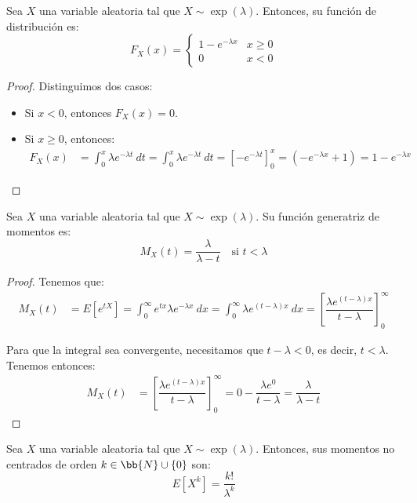 \begin{prop}
    Sea $X$ una variable aleatoria tal que $X\sim \exp(\lambda)$. Entonces, su función de distribución es:
    \begin{equation*}
        F_X(x) = \begin{cases}
            1-e^{-\lambda x} & x\geq 0\\
            0 & x<0
        \end{cases}
    \end{equation*}
\end{prop}
\begin{proof}
    Distinguimos dos casos:
    \begin{itemize}
        \item Si $x<0$, entonces $F_X(x) = 0$.
        \item Si $x\geq 0$, entonces:
        \begin{align*}
            F_X(x) &= \int_{0}^{x} \lambda e^{-\lambda t}~dt
            = \int_{0}^{x} \lambda e^{-\lambda t}~dt
            = \left[ -e^{-\lambda t} \right]_{0}^{x}
            = \left( -e^{-\lambda x} + 1 \right) = 1-e^{-\lambda x}
        \end{align*}
    \end{itemize}
\end{proof}


\begin{prop}
    Sea $X$ una variable aleatoria tal que $X\sim \exp(\lambda)$. Su función generatriz de momentos es:
    \begin{equation*}
        M_X(t) = \dfrac{\lambda}{\lambda-t} \quad \text{si } t<\lambda
    \end{equation*}
\end{prop}
\begin{proof}
    Tenemos que:
    \begin{align*}
        M_X(t) &= E\left[e^{tX}\right] = \int_{0}^{\infty} e^{tx} \lambda e^{-\lambda x}~dx
        = \int_{0}^{\infty} \lambda e^{(t-\lambda)x}~dx
        = \left[ \dfrac{\lambda e^{(t-\lambda)x}}{t-\lambda} \right]_{0}^{\infty}
    \end{align*}

    Para que la integral sea convergente, necesitamos que $t-\lambda<0$, es decir, $t<\lambda$. Tenemos entonces:
    \begin{align*}
        M_X(t) &= \left[ \dfrac{\lambda e^{(t-\lambda)x}}{t-\lambda} \right]_{0}^{\infty}
        = 0 - \dfrac{\lambda e^{0}}{t-\lambda} = \dfrac{\lambda}{\lambda-t}
    \end{align*}
\end{proof}

\begin{prop}
    Sea $X$ una variable aleatoria tal que $X\sim \exp(\lambda)$. Entonces, sus momentos no centrados de orden $k\in \bb{N}\cup \{0\}$ son:
    \begin{equation*}
        E[X^k] = \dfrac{k!}{\lambda^k}
    \end{equation*}
\end{prop}